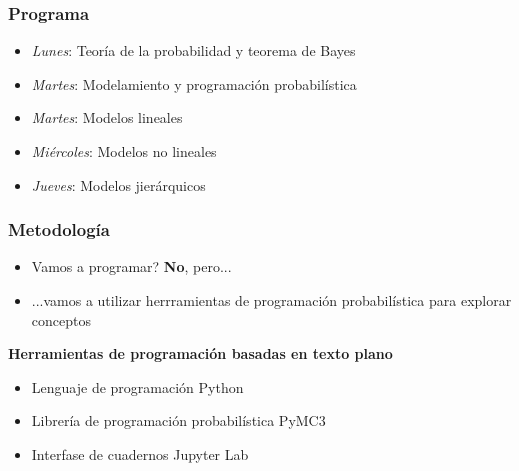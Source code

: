 \documentclass[xcolor=dvipsnames,10pt]{beamer}
\begin{document}
%
\begin{frame}
  \frametitle{Programa}
  \begin{tcolorbox}[title=Fundamentos]
    \begin{itemize}
    \item \emph{Lunes}: Teoría de la probabilidad y teorema de Bayes
    \item \emph{Martes}: Modelamiento y programación probabilística
    \end{itemize}
  \end{tcolorbox}
  \begin{tcolorbox}[title=Regresión]
    \begin{itemize}
    \item \emph{Martes}: Modelos lineales
    \item \emph{Miércoles}: Modelos no lineales
    \item \emph{Jueves}: Modelos jierárquicos
    \end{itemize}
  \end{tcolorbox}
\end{frame}
%
\begin{frame}
  \frametitle{Metodología}
  \begin{itemize}
  \item Vamos a programar? \textbf{No}, pero...
  \item ...vamos a utilizar herrramientas de programación probabilística para explorar conceptos
  \end{itemize}
  \textbf{Herramientas de programación basadas en texto plano}
  \begin{itemize}
  \item Lenguaje de programación \textsf{Python}
  \item Librería de programación probabilística \textsf{PyMC3}
  \item Interfase de cuadernos \textsf{Jupyter Lab}
  \end{itemize}
\end{frame}
%
\end{document}
